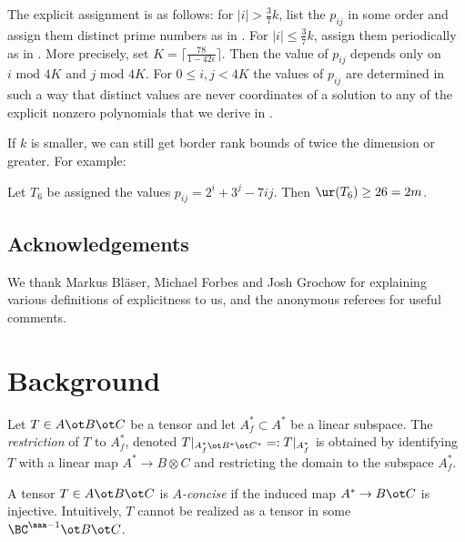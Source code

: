 \documentclass{toc}
\begin{document}
The explicit assignment is as follows: for $|i|>\frac 37k$,  list the $p_{ij}$ in some order and assign them  
distinct  prime numbers as in . For $|i|\leq \frac 37k$,   assign them periodically as in . More precisely, 
set    $K=\lceil \frac{78}{1-42\epsilon}\rceil$. Then  the value of $p_{ij}$ depends only on $i \text{ mod } 4K$ and $j \text{ mod } 4K$. For $0\leq i,j<4K$
the values %
%
%
 of $p_{ij}$
are determined in such a way that 
%
%
%
 distinct values are never coordinates of 
%
a solution to any of the explicit nonzero polynomials that we derive in . 


If $k$ is smaller, we can still get border rank bounds of twice the dimension or greater. For example:

\begin{theorem}\label{thm:explicit}
Let $T_6$ be assigned the values $p_{ij}=2^i+3^j-7ij$.
Then $\ur(T_6)\geq 26=2m$.
\end{theorem}

\subsection*{Acknowledgements}
We thank Markus Bl\"aser,  Michael Forbes and Josh Grochow for explaining various
definitions of explicitness to us, and the anonymous referees for useful comments.
%

\section{Background}
\begin{definition} Let $T\in A\ot B\ot C$ be a tensor and let $A^*_f\subset A^*$ be a linear subspace.
The \emph{restriction} of $T$ to $A_f^*$, denoted $T|_{A_f^*\ot B^*\ot C^*}=:T|_{A^*_f}$ is
obtained by identifying $T$ with a linear map $A^*\rightarrow B\otimes C$ and restricting the domain to the subspace $A_f^*$.  
\end{definition}
A tensor $T\in A\ot B\ot C$ is \emph{$A$-concise} if the induced map $A^*\rightarrow B\ot C$ is injective. Intuitively,   $T$ cannot be realized as a tensor in some  $\BC^{\aaa-1}\ot B\ot C$. 
\end{document}
